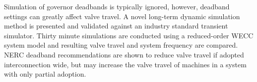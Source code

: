 Simulation of governor deadbands is typically ignored, however, deadband settings can greatly affect valve travel.
A novel long-term dynamic simulation method is presented and validated against an industry standard transient simulator.
Thirty minute simulations are conducted using a reduced-order WECC system model and resulting valve travel and system frequency are compared.
NERC deadband recommendations are shown to reduce valve travel if adopted interconnection wide, but may increase the valve travel of machines in a system with only partial adoption.